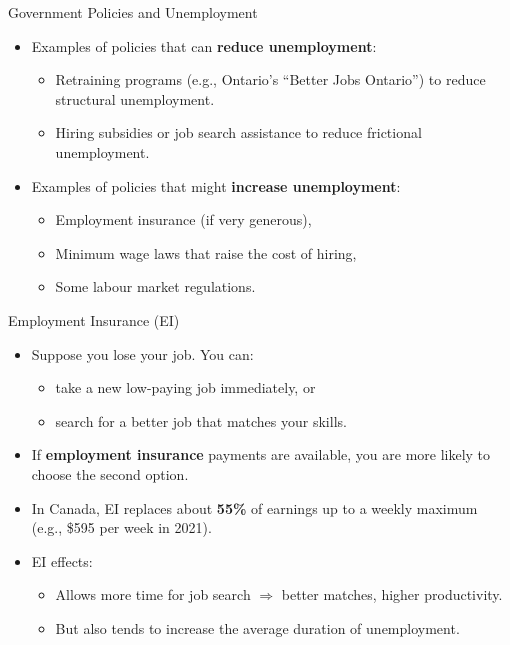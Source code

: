 \documentclass[aspectratio=169]{beamer}
\begin{document}
\begin{frame}{Government Policies and Unemployment}
\transfade
\begin{itemize}[<+->]
  \item Examples of policies that can \textbf{reduce unemployment}:
  \begin{itemize}[<+->]
    \item Retraining programs (e.g., Ontario’s “Better Jobs Ontario”) to reduce structural unemployment.
    \item Hiring subsidies or job search assistance to reduce frictional unemployment.
  \end{itemize}
  \item Examples of policies that might \textbf{increase unemployment}:
  \begin{itemize}[<+->]
    \item Employment insurance (if very generous),
    \item Minimum wage laws that raise the cost of hiring,
    \item Some labour market regulations.
  \end{itemize}
\end{itemize}
\end{frame}

\begin{frame}{Employment Insurance (EI)}
\transfade
\begin{itemize}[<+->]
  \item Suppose you lose your job. You can:
  \begin{itemize}[<+->]
    \item take a new low-paying job immediately, or
    \item search for a better job that matches your skills.
  \end{itemize}
  \item If \textbf{employment insurance} payments are available, you are more likely to choose the second option.
  \item In Canada, EI replaces about \textbf{55\%} of earnings up to a weekly maximum (e.g., \$595 per week in 2021).
  \item EI effects:
  \begin{itemize}[<+->]
    \item Allows more time for job search \(\Rightarrow\) better matches, higher productivity.
    \item But also tends to \alert{increase} the average duration of unemployment.
  \end{itemize}
\end{itemize}
\end{frame}
\end{document}
